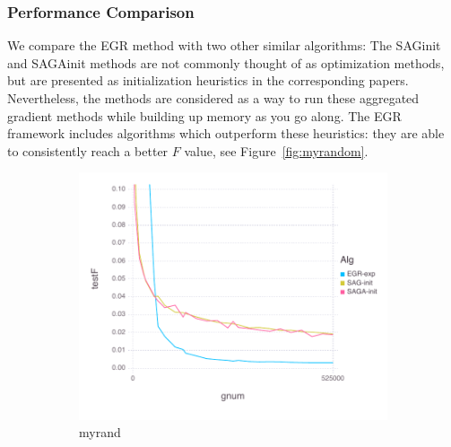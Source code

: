 \documentclass[11pt]{article}
\begin{document}
   \subsubsection{Performance Comparison}   
    
	
   
    We compare the EGR method with two other similar algorithms: The SAGinit and SAGAinit methods are not commonly thought of as optimization methods, but are presented as initialization heuristics in the corresponding papers. Nevertheless, the methods are considered as a way to run these aggregated gradient methods while building up memory as you go along. The EGR framework includes algorithms which outperform these heuristics: they are able to consistently reach a better $F$ value, see Figure~\ref{fig:myrandom}.
	
   
   \begin{figure}[H]
       \centering
       \begin{subfigure}[b]{0.45\textwidth}
           \includegraphics[width=\textwidth]{Figures/myrandBLtrueFfFinal-g.pdf}
           \caption{myrand}
       \end{subfigure}
       ~ %
         \begin{subfigure}[b]{0.45\textwidth}

\end{subfigure}
\end{figure}
\end{document}
